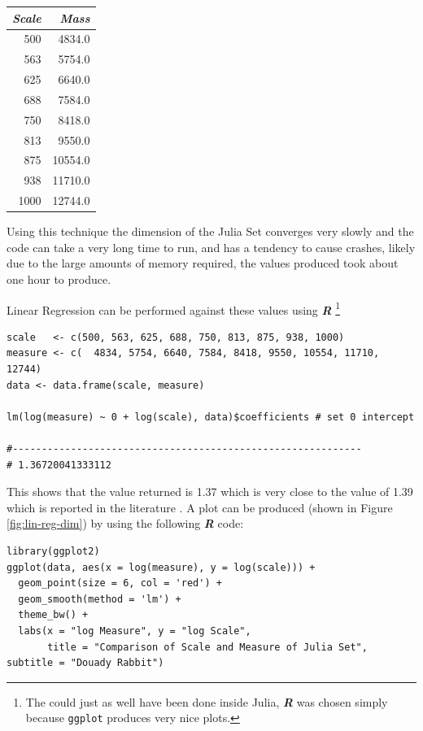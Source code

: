 \documentclass[a4paper,11pt,twoside]{article}
\begin{document}
\begin{center}
\begin{tabular}{rr}
\textbf{\emph{Scale}} & \textbf{\emph{Mass}}\\
\hline
500 & 4834.0\\
563 & 5754.0\\
625 & 6640.0\\
688 & 7584.0\\
750 & 8418.0\\
813 & 9550.0\\
875 & 10554.0\\
938 & 11710.0\\
1000 & 12744.0\\
\end{tabular}

\end{center}


Using this technique the dimension of the Julia Set converges very slowly and
the code can take a very long time to run, and has a tendency to cause crashes,
likely due to the large amounts of memory required, the values produced took
about one hour to produce.

Linear Regression can be performed against these values using \textbf{\emph{R}} \footnote{The could just as well have been done inside Julia, \textbf{\emph{R}} was chosen simply because \texttt{ggplot} produces very nice plots.}

\begin{verbatim}
scale   <- c(500, 563, 625, 688, 750, 813, 875, 938, 1000)
measure <- c(  4834, 5754, 6640, 7584, 8418, 9550, 10554, 11710, 12744)
data <- data.frame(scale, measure)

lm(log(measure) ~ 0 + log(scale), data)$coefficients # set 0 intercept

#------------------------------------------------------------
# 1.36720041333112
\end{verbatim}

This shows that the value returned is 1.37 which is very close to the value of
1.39 which is reported in the literature
\cite{mcmullenHausdorffDimensionConformal1998}. A plot can be produced (shown in Figure \ref{fig:lin-reg-dim}) by using the following \textbf{\emph{R}} code:

\begin{verbatim}
library(ggplot2)
ggplot(data, aes(x = log(measure), y = log(scale))) +
  geom_point(size = 6, col = 'red') +
  geom_smooth(method = 'lm') +
  theme_bw() +
  labs(x = "log Measure", y = "log Scale",
       title = "Comparison of Scale and Measure of Julia Set", subtitle = "Douady Rabbit")
\end{verbatim}
\end{document}
